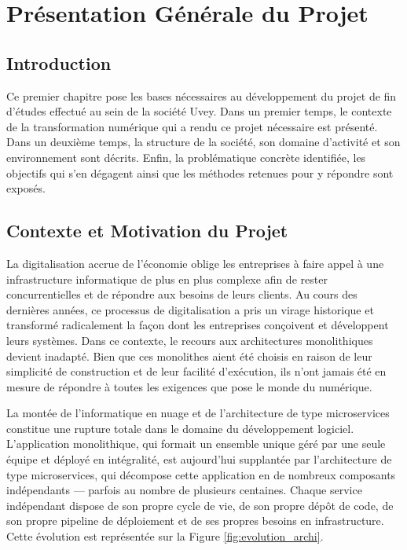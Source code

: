 \chapter{Présentation Générale du Projet}
\label{chap:intro}

\section*{Introduction}

Ce premier chapitre pose les bases nécessaires au développement du projet de fin d'études effectué au sein de la société Uvey. Dans un premier temps, le contexte de la transformation numérique qui a rendu ce projet nécessaire est présenté. Dans un deuxième temps, la structure de la société, son domaine d'activité et son environnement sont décrits. Enfin, la problématique concrète identifiée, les objectifs qui s'en dégagent ainsi que les méthodes retenues pour y répondre sont exposés.


\section{Contexte et Motivation du Projet}
\label{sec:contexte}

La digitalisation accrue de l'économie oblige les entreprises à faire appel à une infrastructure informatique de plus en plus complexe afin de rester concurrentielles et de répondre aux besoins de leurs clients. Au cours des dernières années, ce processus de digitalisation a pris un virage historique et transformé radicalement la façon dont les entreprises conçoivent et développent leurs systèmes. Dans ce contexte, le recours aux architectures monolithiques devient inadapté. Bien que ces monolithes aient été choisis en raison de leur simplicité de construction et de leur facilité d'exécution, ils n'ont jamais été en mesure de répondre à toutes les exigences que pose le monde du numérique.

La montée de l'informatique en nuage et de l'architecture de type microservices constitue une rupture totale dans le domaine du développement logiciel. L'application monolithique, qui formait un ensemble unique géré par une seule équipe et déployé en intégralité, est aujourd'hui supplantée par l'architecture de type microservices, qui décompose cette application en de nombreux composants indépendants --- parfois au nombre de plusieurs centaines. Chaque service indépendant dispose de son propre cycle de vie, de son propre dépôt de code, de son propre pipeline de déploiement et de ses propres besoins en infrastructure. Cette évolution est représentée sur la Figure \ref{fig:evolution_archi}.

